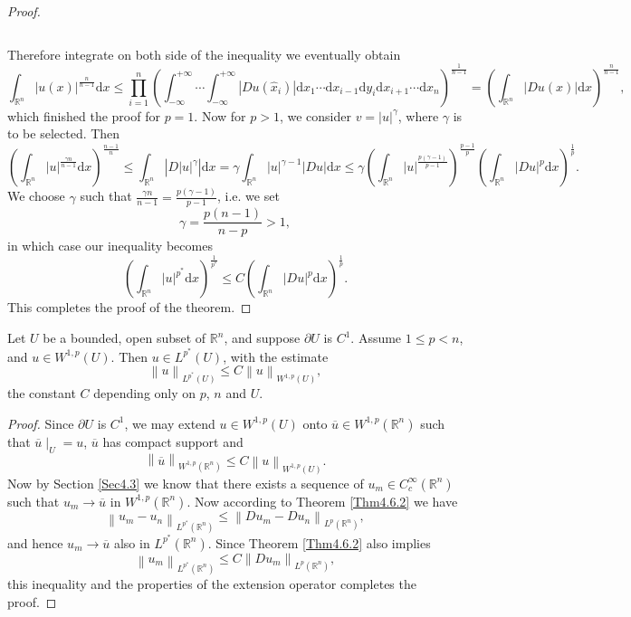 \begin{proof}
\begin{small}
$$$$
\end{small}
Therefore integrate on both side of the inequality we eventually obtain 
$$
\int_{\mathbb{R} ^n}{\left| u\left( x \right) \right|^{\frac{n}{n-1}}\mathrm{d}x}\le \prod_{i=1}^n{\left( \int_{-\infty}^{+\infty}{\cdots \int_{-\infty}^{+\infty}{\left| Du\left( \widehat{x}_i \right) \right|\mathrm{d}x_1\cdots \mathrm{d}x_{i-1}\mathrm{d}y_i\mathrm{d}x_{i+1}\cdots \mathrm{d}x_n}} \right) ^{\frac{1}{n-1}}}=\left( \int_{\mathbb{R} ^n}{\left| Du\left( x \right) \right|\mathrm{d}x} \right) ^{\frac{n}{n-1}},
$$
which finished the proof for $p=1$. Now for $p>1$, we consider $v=|u|^\gamma$, where $\gamma$ is to be selected. Then 
$$
\left( \int_{\mathbb{R} ^n}{\left| u \right|^{\frac{\gamma n}{n-1}}\mathrm{d}x} \right) ^{\frac{n-1}{n}}\le \int_{\mathbb{R} ^n}{\left| D\left| u \right|^{\gamma} \right|\mathrm{d}x}=\gamma \int_{\mathbb{R} ^n}{\left| u \right|^{\gamma -1}\left| Du \right|\mathrm{d}x}\le \gamma \left( \int_{\mathbb{R} ^n}{\left| u \right|^{\frac{p\left( \gamma -1 \right)}{p-1}}} \right) ^{\frac{p-1}{p}}\left( \int_{\mathbb{R} ^n}{\left| Du \right|^p\mathrm{d}x} \right) ^{\frac{1}{p}}.
$$
We choose $\gamma$ such that $\frac{\gamma n}{n-1}=\frac{p(\gamma-1)}{p-1}$, i.e. we set 
$$
\gamma =\frac{p\left( n-1 \right)}{n-p}>1,
$$
in which case our inequality becomes 
$$
\left( \int_{\mathbb{R} ^n}{\left| u \right|^{p^*}\mathrm{d}x} \right) ^{\frac{1}{p^*}}\le C\left( \int_{\mathbb{R} ^n}{\left| Du \right|^p\mathrm{d}x} \right) ^{\frac{1}{p}}.
$$
This completes the proof of the theorem.
\end{proof}
\begin{theorem}\label{Thm4.6.3}
Let $U$ be a bounded, open subset of $\mathbb{R}^n$, and suppose $\partial U$ is $C^1$. Assume $1\le p<n$, and $u\in W^{1,p}(U)$. Then $u\in L^{p^*}(U)$, with the estimate 
$$
\left\| u \right\| _{L^{p^*}\left( U \right)}\le C\left\| u \right\| _{W^{1,p}\left( U \right)},
$$
the constant $C$ depending only on $p$, $n$ and $U$.
\end{theorem}
\begin{proof}
Since $\partial U$ is $C^1$, we may extend $u\in W^{1,p}(U)$ onto $\overline{u}\in W^{1,p}(\mathbb{R}^n)$ such that $\overline{u}\mid_{U}=u$, $\overline{u}$ has compact support and 
$$
\left\| \overline{u} \right\| _{W^{1,p}\left( \mathbb{R} ^n \right)}\le C\left\| u \right\| _{W^{1,p}\left( U \right)}.
$$
Now by Section \ref{Sec4.3} we know that there exists a sequence of $u_m\in C_c^\infty(\mathbb{R}^n)$ such that $u_m\to\overline{u}$ in $W^{1,p}(\mathbb{R}^n)$. Now according to Theorem \ref{Thm4.6.2} we have 
$$
\left\| u_m-u_n \right\| _{L^{p^*}\left( \mathbb{R} ^n \right)}\le \left\| Du_m-Du_n \right\| _{L^p\left( \mathbb{R} ^n \right)},
$$
and hence $u_m\to\overline{u}$ also in $L^{p^*}(\mathbb{R}^n)$. Since Theorem \ref{Thm4.6.2} also implies 
$$
\left\| u_m \right\| _{L^{p^*}\left( \mathbb{R} ^n \right)}\le C\left\| Du_m \right\| _{L^p\left( \mathbb{R} ^n \right)},
$$
this inequality and the properties of the extension operator completes the proof.
\end{proof}
